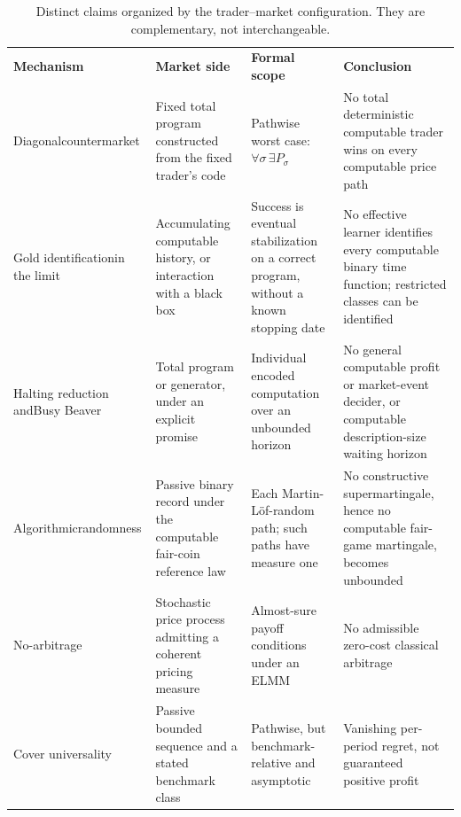 \documentclass[aps,pra,reprint,superscriptaddress,amsmath,amssymb,floatfix]{revtex4-2}
\theoremstyle{plain}
\theoremstyle{definition}
\theoremstyle{remark}
\begin{document}
\begin{table}[t]
\caption{\label{tab:claimmap}Distinct claims organized by the trader--market
configuration. They are complementary, not interchangeable.}
\centering
\begin{ruledtabular}
\begin{tabular}{p{}p{}p{}p{}}
\textbf{Mechanism} & \textbf{Market side} & \textbf{Formal scope}
& \textbf{Conclusion} \\
\colrule
Diagonal\newline\mbox{countermarket}
& Fixed total program constructed from the fixed trader's code
& Pathwise worst case:
\(\forall\sigma\,\exists P_\sigma\)
& No total deterministic computable trader wins on every computable price path \\
Gold identification\newline in the limit
& Accumulating computable history, or interaction with a black box
& Success is eventual stabilization on a correct program, without a known
stopping date
& No effective learner identifies every computable binary time function;
restricted classes can be identified \\
Halting reduction and\newline Busy Beaver
& Total program or generator, under an explicit promise
& Individual encoded computation over an unbounded horizon
& No general computable profit or market-event decider, or computable
description-size waiting horizon \\
Algorithmic\newline randomness
& Passive binary record under the computable fair-coin reference law
& Each Martin-L\"of-random path; such paths have measure one
& No constructive supermartingale, hence no computable fair-game martingale,
becomes unbounded \\
No-arbitrage
& Stochastic price process admitting a coherent pricing measure
& Almost-sure payoff conditions under an ELMM
& No admissible zero-cost classical arbitrage \\
Cover universality
& Passive bounded sequence and a stated benchmark class
& Pathwise, but benchmark-relative and asymptotic
& Vanishing per-period regret, not guaranteed positive profit \\
\end{tabular}
\end{ruledtabular}
\end{table}
\end{document}
